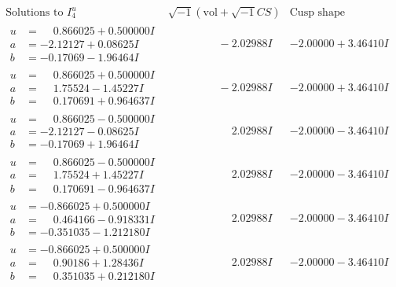 \documentclass[1p]{elsarticle_modified}
\theoremstyle{definition}
\newcommand{\I}{\sqrt{-1}}
\begin{document}
$$\begin{array}{c|c|c}  
\text{Solutions to }I^u_{4}& \I (\text{vol} + \sqrt{-1}CS) & \text{Cusp shape}\\
 \hline 
\begin{aligned}
u &= \phantom{-}0.866025 + 0.500000 I \\
a &= -2.12127 + 0.08625 I \\
b &= -0.17069 - 1.96464 I\end{aligned}
 & \phantom{-0.000000 } -2.02988 I & -2.00000 + 3.46410 I \\ \hline\begin{aligned}
u &= \phantom{-}0.866025 + 0.500000 I \\
a &= \phantom{-}1.75524 - 1.45227 I \\
b &= \phantom{-}0.170691 + 0.964637 I\end{aligned}
 & \phantom{-0.000000 } -2.02988 I & -2.00000 + 3.46410 I \\ \hline\begin{aligned}
u &= \phantom{-}0.866025 - 0.500000 I \\
a &= -2.12127 - 0.08625 I \\
b &= -0.17069 + 1.96464 I\end{aligned}
 & \phantom{-0.000000 -}2.02988 I & -2.00000 - 3.46410 I \\ \hline\begin{aligned}
u &= \phantom{-}0.866025 - 0.500000 I \\
a &= \phantom{-}1.75524 + 1.45227 I \\
b &= \phantom{-}0.170691 - 0.964637 I\end{aligned}
 & \phantom{-0.000000 -}2.02988 I & -2.00000 - 3.46410 I \\ \hline\begin{aligned}
u &= -0.866025 + 0.500000 I \\
a &= \phantom{-}0.464166 - 0.918331 I \\
b &= -0.351035 - 1.212180 I\end{aligned}
 & \phantom{-0.000000 -}2.02988 I & -2.00000 - 3.46410 I \\ \hline\begin{aligned}
u &= -0.866025 + 0.500000 I \\
a &= \phantom{-}0.90186 + 1.28436 I \\
b &= \phantom{-}0.351035 + 0.212180 I\end{aligned}
 & \phantom{-0.000000 -}2.02988 I & -2.00000 - 3.46410 I \\ \hline\begin{aligned}

\end{aligned}
\end{array}$$
\end{document}
